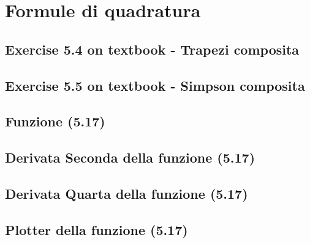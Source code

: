 \section{Formule di quadratura}

\subsection{Exercise 5.4 on textbook - Trapezi composita}
\label{subsec:exercise54}
 

\subsection{Exercise 5.5 on textbook - Simpson composita}
\label{subsec:scriptForExercise55}


\subsection{Funzione (5.17)}
\label{subsec:function517}


\subsection{Derivata Seconda della funzione (5.17)}
\label{subsec:secondDer517}


\subsection{Derivata Quarta della funzione (5.17)}
\label{subsec:fourthDer517}


\subsection{Plotter della funzione (5.17)}
\label{subsec:functionPlotter517}
